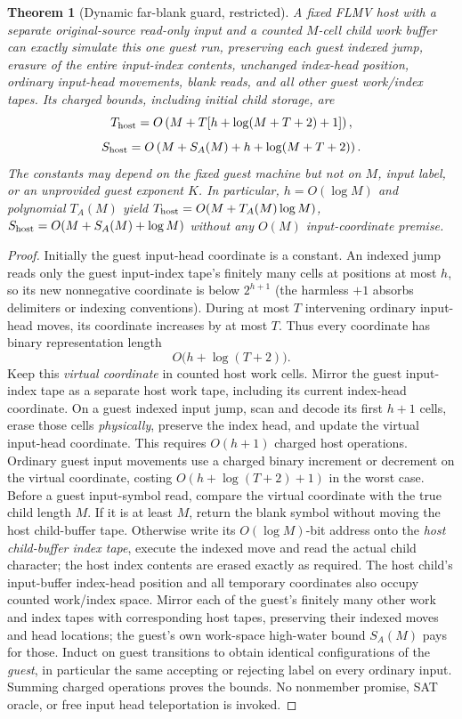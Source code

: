 \documentclass[11pt]{article}
\newtheorem{theorem}{Theorem}
\begin{document}
\begin{theorem}[Dynamic far-blank guard, restricted]
A fixed FLMV host with a separate original-source read-only input and a counted $M$-cell child work buffer can exactly simulate this one guest run, preserving each guest indexed jump, erasure of the entire input-index contents, unchanged index-head position, ordinary input-head movements, blank reads, and all other guest work/index tapes. Its charged bounds, including initial child storage, are
\[
T_{\rm host}=O\left(M+T[h+\log(M+T+2)+1]\right),
\]
\[
S_{\rm host}=O\left(M+S_A(M)+h+\log(M+T+2)\right).
\]
The constants may depend on the fixed guest machine but not on $M$, input label, or an unprovided guest exponent $K$. In particular, $h=O(\log M)$ and polynomial $T_A(M)$ yield $T_{\rm host}=O(M+T_A(M)\log M)$, $S_{\rm host}=O(M+S_A(M)+\log M)$ \emph{without any $O(M)$ input-coordinate premise}.
\end{theorem}
\begin{proof}
Initially the guest input-head coordinate is a constant. An indexed jump reads only the guest input-index tape's finitely many cells at positions at most $h$, so its new nonnegative coordinate is below $2^{h+1}$ (the harmless $+1$ absorbs delimiters or indexing conventions). During at most $T$ intervening ordinary input-head moves, its coordinate increases by at most $T$. Thus every coordinate has binary representation length
\[
O\bigl(h+\log(T+2)\bigr).
\]
Keep this \emph{virtual coordinate} in counted host work cells. Mirror the guest input-index tape as a separate host work tape, including its current index-head coordinate. On a guest indexed input jump, scan and decode its first $h+1$ cells, erase those cells \emph{physically}, preserve the index head, and update the virtual input-head coordinate. This requires $O(h+1)$ charged host operations. Ordinary guest input movements use a charged binary increment or decrement on the virtual coordinate, costing $O(h+\log(T+2)+1)$ in the worst case. Before a guest input-symbol read, compare the virtual coordinate with the true child length $M$. If it is at least $M$, return the blank symbol without moving the host child-buffer tape. Otherwise write its $O(\log M)$-bit address onto the \emph{host child-buffer index tape}, execute the indexed move and read the actual child character; the host index contents are erased exactly as required. The host child's input-buffer index-head position and all temporary coordinates also occupy counted work/index space. Mirror each of the guest's finitely many other work and index tapes with corresponding host tapes, preserving their indexed moves and head locations; the guest's own work-space high-water bound $S_A(M)$ pays for those. Induct on guest transitions to obtain identical configurations of the \emph{guest}, in particular the same accepting or rejecting label on every ordinary input. Summing charged operations proves the bounds. No nonmember promise, SAT oracle, or free input head teleportation is invoked.
\end{proof}
\end{document}

